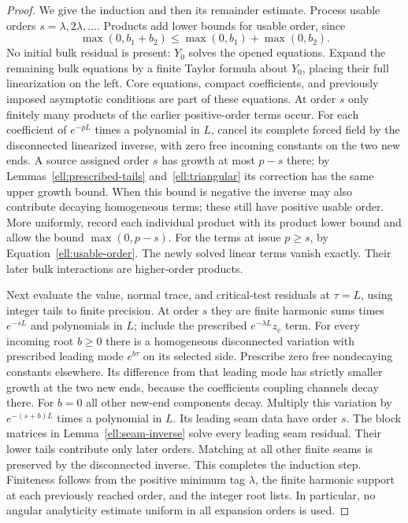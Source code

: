 \begin{proof}
We give the induction and then its remainder estimate.  Process
usable orders $s=\lambda,2\lambda,\ldots$.  Products add lower
bounds for usable order, since
\[
 \max(0,b_1+b_2)\le\max(0,b_1)+\max(0,b_2).
\]
No initial bulk residual is present: $Y_0$ solves the opened
equations.  Expand the remaining bulk equations by a finite
Taylor formula about $Y_0$, placing their full linearization
on the left.  Core equations, compact coefficients, and
previously imposed asymptotic conditions are part of these
equations.  At order $s$ only finitely many products of the
earlier positive-order terms occur.  For each coefficient of
$e^{-pL}$ times a polynomial in $L$, cancel its complete forced
field by the disconnected linearized inverse, with zero free
incoming constants on the two new ends.  A source assigned
order $s$ has growth at most $p-s$ there; by
Lemmas~\ref{ell:prescribed-tails} and~\ref{ell:triangular} its
correction has the same upper growth bound.  When this bound
is negative the inverse may also contribute decaying
homogeneous terms; these still have positive usable order.
More uniformly, record each individual product with its
product lower bound and allow the bound $\max(0,p-s)$.
For the terms at issue $p\ge s$, by
Equation~\eqref{ell:usable-order}.  The newly solved linear
terms vanish exactly.  Their later bulk interactions are
higher-order products.

Next evaluate the value, normal trace, and critical-test
residuals at $\tau=L$, using integer tails to finite precision.
At order $s$ they are finite harmonic sums times
$e^{-sL}$ and polynomials in $L$; include the prescribed
$e^{-\lambda L}z_e$ term.  For every incoming root $b\ge0$
there is a homogeneous disconnected variation with prescribed
leading mode $e^{b\tau}$ on its selected side.  Prescribe zero
free nondecaying constants elsewhere.  Its difference from
that leading mode has strictly smaller growth at the two
new ends, because the coefficients coupling channels decay
there.  For $b=0$ all other new-end components decay.
Multiply this variation by $e^{-(s+b)L}$ times a polynomial
in $L$.  Its leading seam data have order $s$.  The block
matrices in Lemma~\ref{ell:seam-inverse} solve every leading
seam residual.  Their lower tails contribute only later
orders.  Matching at all other finite seams is preserved by
the disconnected inverse.  This completes the induction step.
Finiteness follows from the positive minimum tag $\lambda$,
the finite harmonic support at each previously reached order,
and the integer root lists.  In particular, no angular
analyticity estimate uniform in all expansion orders is used.


\end{proof}
